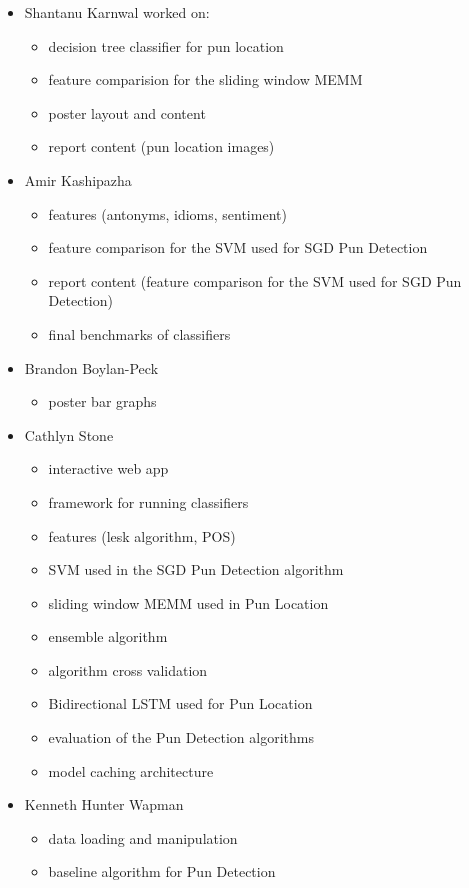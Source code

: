 \documentclass{article}
\begin{document}
\begin{itemize}
\item Shantanu Karnwal worked on:
	\begin{itemize}
		\item decision tree classifier for pun location
		\item feature comparision for the sliding window MEMM
		\item poster layout and content
		\item report content (pun location images)
	\end{itemize}
\item Amir Kashipazha
	\begin{itemize}
		\item features (antonyms, idioms, sentiment)
		\item feature comparison for the SVM used for SGD Pun Detection
		\item report content (feature comparison for the SVM used for SGD Pun Detection)
		\item final benchmarks of classifiers
	\end{itemize}
\item Brandon Boylan-Peck
	\begin{itemize}
		\item poster bar graphs
	\end{itemize}
\item Cathlyn Stone
	\begin{itemize}
		\item interactive web app
		\item framework for running classifiers
		\item features (lesk algorithm, POS)
		\item SVM used in the SGD Pun Detection algorithm
		\item sliding window MEMM used in Pun Location
		\item ensemble algorithm
		\item algorithm cross validation
		\item Bidirectional LSTM used for Pun Location
		\item evaluation of the Pun Detection algorithms
		\item model caching architecture
	\end{itemize}
\item Kenneth Hunter Wapman
	\begin{itemize}
		\item data loading and manipulation
		\item baseline algorithm for Pun Detection

\end{itemize}
\end{itemize}
\end{document}
